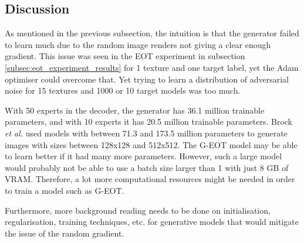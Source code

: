\subsection{Discussion}

As mentioned in the previous subsection, the intuition is that the generator failed to learn much due to the random image renders not giving a clear enough gradient. This issue was seen in the EOT experiment in subsection \ref{subsec:eot_experiment_results} for 1 texture and one target label, yet the Adam optimiser could overcome that. Yet trying to learn a distribution of adversarial noise for 15 textures and 1000 or 10 target models was too much. 

With 50 experts in the decoder, the generator has 36.1 million trainable parameters, and with 10 experts it has 20.5 million trainable parameters. Brock \textit{et al.} \cite{big_gan} used models with between 71.3 and 173.5 million parameters to generate images with sizes between 128x128 and 512x512. The G-EOT model may be able to learn better if it had many more parameters. However, such a large model would probably not be able to use a batch size larger than 1 with just 8 GB of VRAM. Therefore, a lot more computational resources might be needed in order to train a model such as G-EOT.

Furthermore, more background reading needs to be done on initialisation, regularisation, training techniques, etc. for generative models that would mitigate the issue of the random gradient.

